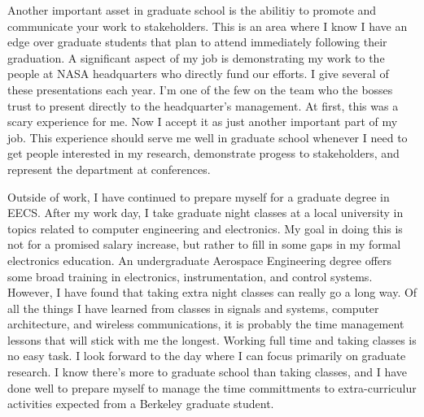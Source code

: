 \documentclass{article}
\begin{document}
Another important asset in graduate school is the abilitiy to promote and communicate your
work to stakeholders. This is an area where I know I have an edge over graduate students
that plan to attend immediately following their graduation. A significant aspect of my
job is demonstrating my work to the people at NASA headquarters who directly fund our
efforts. I give several of these presentations each year. I'm one of the few on the
team who the bosses trust to present directly to the headquarter's management. At first,
this was a scary experience for me. Now I accept it as just another important part of my job.
This experience should serve me well in graduate school whenever I need to get people interested
in my research, demonstrate progess to stakeholders, and represent the department at conferences.

Outside of work, I have continued to prepare myself for a graduate degree in EECS. After
my work day, I take graduate night classes at a local university in topics related to
computer engineering and electronics. My goal in doing this is not for a promised
salary increase, but rather to fill in some gaps in my formal electronics education.
An undergraduate Aerospace Engineering degree offers some broad training in electronics,
instrumentation, and control systems. However, I have found that taking extra night classes
can really go a long way. Of all the things I have learned from classes in signals and systems, 
computer architecture, and wireless communications, it is probably the time management
lessons that will stick with me the longest. Working full time and taking classes is
no easy task. I look forward to the day where I can focus primarily on graduate
research. I know there's more to graduate school than taking classes, and
I have done well to prepare myself to manage the time committments to extra-curriculur
activities expected from a Berkeley graduate student.
\end{document}
